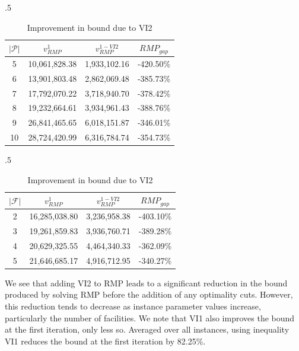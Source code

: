 \documentclass[12pt]{article}
\theoremstyle{thmstylethree}%
\begin{document}
\begin{table}[htp]
\begin{subtable}[c]{.5\textwidth}
\small
\centering
\begin{tabular}{|c|c|c|c|}
\hline
$\vert \mathcal{P} \vert$ & $v_{RMP}^{1}$ & $v_{RMP}^{1-VI2}$ & $RMP_{gap}$ \\
\hline
5 &  10,061,828.38  &  1,933,102.16  & -420.50\% \\
6 &  13,901,803.48  &  2,862,069.48  & -385.73\% \\
7 &  17,792,070.22  &  3,718,940.70  & -378.42\% \\
8 &  19,232,664.61  &  3,934,961.43  & -388.76\% \\
9 &  26,841,465.65  &  6,018,151.87  & -346.01\% \\
10 &  28,724,420.99  &  6,316,784.74  & -354.73\% \\
\hline
\end{tabular}
\label{tbl:avg_rmp_gap_by_p}
\end{subtable}
\begin{subtable}[c]{.5\textwidth}
\center
\small
\begin{tabular}{|c|c|c|c|}
\hline
$\vert \mathcal{F} \vert$ & $v_{RMP}^{1}$ & $v_{RMP}^{1-VI2}$ & $RMP_{gap}$ \\
\hline
2 &  16,285,038.80  &  3,236,958.38  & -403.10\% \\
3 &  19,261,859.83  &  3,936,760.71  & -389.28\% \\
4 &  20,629,325.55  &  4,464,340.33  & -362.09\% \\
5 &  21,646,685.17  &  4,916,712.95  & -340.27\% \\
\hline
\end{tabular}
\label{tbl:avg_rmp_gap_by_f}
\end{subtable}
\caption{Improvement in bound due to VI2}
\end{table}

We see that adding VI2 to RMP leads to a significant reduction in the bound produced by solving RMP before the addition of any optimality cuts. However, this reduction tends to decrease as instance parameter values increase, particularly the number of facilities. We note that VI1 also improves the bound at the first iteration, only less so. Averaged over all instances, using inequality VI1 reduces the bound at the first iteration by 82.25\%. 
 
\end{document}
